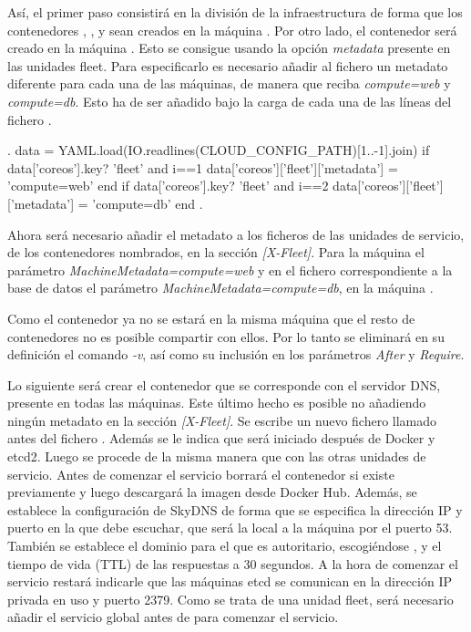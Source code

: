 Así, el primer paso consistirá en la división de la infraestructura de forma que los contenedores , ,  y  sean creados en la máquina . Por otro lado, el contenedor  será creado en la máquina . Esto se consigue usando la opción \textit{metadata} presente en las unidades fleet. Para especificarlo es necesario añadir al fichero  un metadato diferente para cada una de las máquinas, de manera que  reciba \textit{compute=web} y  \textit{compute=db}. Esto ha de ser añadido bajo la carga de cada una de las líneas del fichero .

\begin{codelisting}
\label{code:vagrantfile2}
\begin{code}
.
data = YAML.load(IO.readlines(CLOUD_CONFIG_PATH)[1..-1].join)
if data['coreos'].key? 'fleet' and i==1
  data['coreos']['fleet']['metadata'] = 'compute=web'
end
if data['coreos'].key? 'fleet' and i==2
 data['coreos']['fleet']['metadata'] = 'compute=db'
end
.
\end{code}
\end{codelisting}

Ahora será necesario añadir el metadato a los ficheros de las unidades de servicio, de los contenedores nombrados, en la sección \textit{[X-Fleet]}. Para la máquina  el parámetro \textit{MachineMetadata=compute=web} y en el fichero correspondiente a la base de datos el parámetro \textit{MachineMetadata=compute=db}, en la máquina .

Como el contenedor  ya no se estará en la misma máquina que el resto de contenedores no es posible compartir  con ellos. Por lo tanto se eliminará en su definición el comando \textit{-v}, así como su inclusión en los parámetros \textit{After} y \textit{Require}.

Lo siguiente será crear el contenedor que se corresponde con el servidor DNS, presente en todas las máquinas. Este último hecho es posible no añadiendo ningún metadato en la sección \textit{[X-Fleet]}. Se escribe un nuevo fichero llamado  antes del fichero . Además se le indica que será iniciado después de Docker y etcd2. Luego se procede de la misma manera que con las otras unidades de servicio. Antes de comenzar el servicio borrará el contenedor si existe previamente y luego descargará la imagen desde Docker Hub. Además, se establece la configuración de SkyDNS de forma que se especifica la dirección IP y puerto en la que debe escuchar, que será la local a la máquina por el puerto 53. También se establece el dominio para el que es autoritario, escogiéndose , y el tiempo de vida (TTL) de las respuestas a 30 segundos. A la hora de comenzar el servicio restará indicarle que las máquinas etcd se comunican en la dirección IP privada en uso y puerto 2379. Como se trata de una unidad fleet, será necesario añadir el servicio global  antes de  para comenzar el servicio. 


